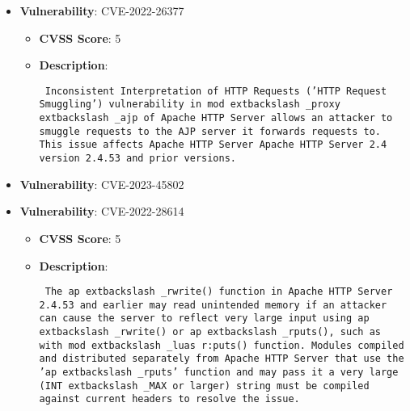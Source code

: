 \documentclass{article}
\begin{document}
\begin{itemize}
        \item \textbf{Vulnerability}: CVE-2022-26377
        \begin{itemize}
            \item \textbf{CVSS Score}:  5 
            \item \textbf{Description}: \parbox{\linewidth}{\texttt{ Inconsistent Interpretation of HTTP Requests ('HTTP Request Smuggling') vulnerability in mod	extbackslash _proxy	extbackslash _ajp of Apache HTTP Server allows an attacker to smuggle requests to the AJP server it forwards requests to. This issue affects Apache HTTP Server Apache HTTP Server 2.4 version 2.4.53 and prior versions. }}
        \end{itemize}
    
        \item \textbf{Vulnerability}: CVE-2023-45802
    
        \item \textbf{Vulnerability}: CVE-2022-28614
        \begin{itemize}
            \item \textbf{CVSS Score}:  5 
            \item \textbf{Description}: \parbox{\linewidth}{\texttt{ The ap	extbackslash _rwrite() function in Apache HTTP Server 2.4.53 and earlier may read unintended memory if an attacker can cause the server to reflect very large input using ap	extbackslash _rwrite() or ap	extbackslash _rputs(), such as with mod	extbackslash _luas r:puts() function. Modules compiled and distributed separately from Apache HTTP Server that use the 'ap	extbackslash _rputs' function and may pass it a very large (INT	extbackslash _MAX or larger) string must be compiled against current headers to resolve the issue. }}
        \end{itemize}
    

\end{itemize}
\end{document}
